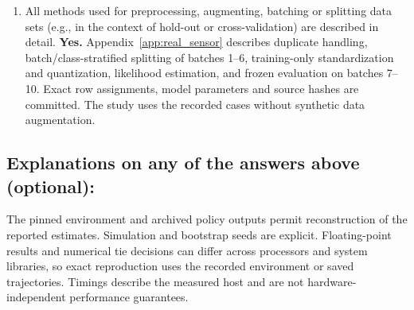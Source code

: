 \documentclass[manuscript, screen, review]{jair}
\begin{document}
\begin{enumerate}
\item All methods used for preprocessing, augmenting, batching or splitting data sets (e.g., in the context of hold-out or cross-validation) are described in detail. \textbf{Yes.} Appendix~\ref{app:real_sensor} describes duplicate handling, batch/class-stratified splitting of batches 1--6, training-only standardization and quantization, likelihood estimation, and frozen evaluation on batches 7--10. Exact row assignments, model parameters and source hashes are committed. The study uses the recorded cases without synthetic data augmentation.
\end{enumerate}

\subsection*{Explanations on any of the answers above (optional):}
The pinned environment and archived policy outputs permit reconstruction of the reported estimates. Simulation and bootstrap seeds are explicit. Floating-point results and numerical tie decisions can differ across processors and system libraries, so exact reproduction uses the recorded environment or saved trajectories. Timings describe the measured host and are not hardware-independent performance guarantees.
\end{document}
